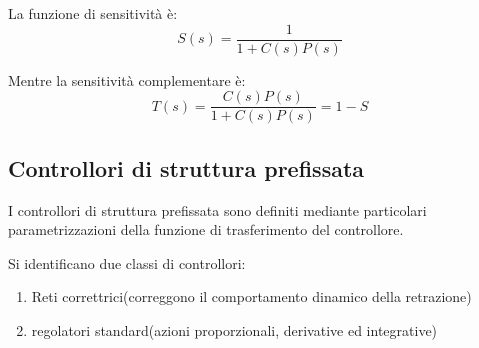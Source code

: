 La funzione di sensitività è:
\begin{equation}
  S(s) = \frac{1}{1 + C(s)P(s)}
\end{equation}

Mentre la sensitività complementare è:
\begin{equation}
  T(s) = \frac{C(s)P(s)}{1 + C(s)P(s)} = 1 - S
\end{equation}


\subsection{Controllori di struttura prefissata}
\begin{definition}
  I controllori di struttura prefissata sono definiti mediante particolari 
  parametrizzazioni della funzione di trasferimento del controllore.
\end{definition}

Si identificano due classi di controllori:
\begin{enumerate}
  \item Reti correttrici(correggono il comportamento dinamico della retrazione)
  \item regolatori standard(azioni proporzionali, derivative ed integrative)
\end{enumerate}

\newpage

